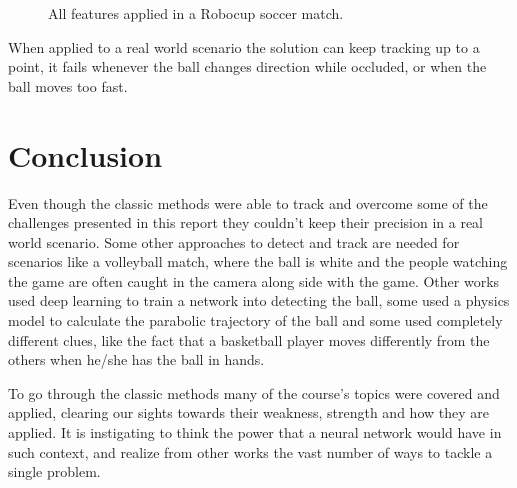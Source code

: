 \documentclass[10pt,twocolumn,letterpaper]{article}
\begin{document}
  \begin{figure}[!h]
    \centering
    \setlength{\fboxsep}{1pt}
    \setlength{\fboxrule}{1pt}
    \caption{All features applied in a Robocup soccer match.}\label{fig:robocup_1}
  \end{figure}

  When applied to a real world scenario the solution can keep tracking up to a
  point, it fails whenever the ball changes direction while occluded, or when
  the ball moves too fast.

  \section{Conclusion}\label{sec:conclusion}

  Even though the classic methods were able to track and overcome some of the
  challenges presented in this report they couldn't keep their precision in a real world
  scenario. Some other approaches to detect and track are needed for scenarios
  like a volleyball match, where the ball is white and the people watching the
  game are often caught in the camera along side with the game. Other works used deep
  learning to train a network into detecting the ball, some used a physics model
  to calculate the parabolic trajectory of the ball and some used completely
  different clues, like the fact that a basketball player moves differently from
  the others when he/she has the ball in hands.

  To go through the classic methods many of the course's topics were covered and
  applied, clearing our sights towards their weakness, strength and how they are
  applied. It is instigating to think the power that a neural network would have
  in such context, and realize from other works the vast number of ways to
  tackle a single problem.

{\small


}
\end{document}
